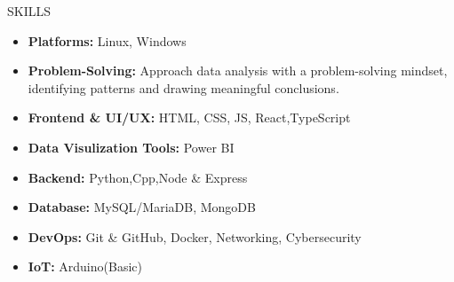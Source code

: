 \documentclass{resume}
\begin{document}
\vspace{-0.4em}

\begin{rSection}{SKILLS}
    \begin{itemize}
        \item \textbf{Platforms:} Linux, Windows
              \vspace{-0.4em}
        \item \textbf{Problem-Solving:} Approach data analysis with a problem-solving mindset, identifying patterns and drawing meaningful conclusions.
              \vspace{-0.4em}
        \item \textbf{Frontend \& UI/UX: } HTML, CSS, JS, React,TypeScript
              \vspace{-0.4em}
        \item \textbf{Data Visulization Tools:} Power BI
        \item \textbf{Backend: } Python,Cpp,Node \& Express
              \vspace{-0.4em}
        \item \textbf{Database: } MySQL/MariaDB, MongoDB
              \vspace{-0.4em}
        \item \textbf{DevOps:} Git \& GitHub, Docker, Networking, Cybersecurity
              \vspace{-0.4em}
        \item \textbf{IoT:} Arduino(Basic)
    \end{itemize}
\end{rSection}
\vspace{-0.4em}
\end{document}
